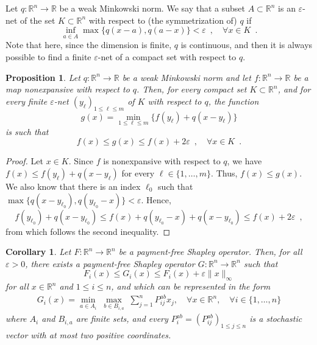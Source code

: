 \documentclass[a4paper,11pt]{amsart}
\newtheorem{proposition}[theorem]{Proposition}
\newtheorem{corollary}[theorem]{Corollary}
\theoremstyle{definition}
\theoremstyle{remark}
\begin{document}
Let $q: {\mathbb{R}}^n \to {\mathbb{R}}$ be a weak Minkowski norm.
We say that a subset $A \subset {\mathbb{R}}^n$ is an $\varepsilon$-net of the set $K \subset {\mathbb{R}}^n$ with respect to (the symmetrization of) $q$ if
\[
  \inf_{a \in A} \max \{ q(x-a),q(a-x) \} < \varepsilon \enspace , \quad \forall x \in K \enspace .
\]
Note that here, since the dimension is finite, $q$ is continuous, and then it is always possible to find a finite $\varepsilon$-net of a compact set with respect to $q$.
\begin{proposition}
  Let $q: {\mathbb{R}}^n \to {\mathbb{R}}$ be a weak Minkowski norm and let $f: {\mathbb{R}}^n \to {\mathbb{R}}$ be a map nonexpansive with respect to $q$.
  Then, for every compact set $K \subset {\mathbb{R}}^n$, and for every finite $\varepsilon$-net $(y_\ell)_{1 {\leqslant} \ell {\leqslant} m}$ of $K$ with respect to $q$, the function
  \[
    g(x) = \min_{1 {\leqslant} \ell {\leqslant} m} \{ f(y_\ell) + q(x-y_\ell) \}
  \]
  is such that
  \[
    f(x) {\leqslant} g(x) {\leqslant} f(x) + 2 \varepsilon \enspace, \quad \forall x \in K \enspace .
  \]
\end{proposition}

\begin{proof}
  Let $x \in K$.
  Since $f$ is nonexpansive with respect to $q$, we have $f(x) {\leqslant} f(y_\ell) + q(x-y_\ell)$ for every $\ell \in \{1,\dots,m\}$.
  Thus, $f(x) {\leqslant} g(x)$.
  We also know that there is an index $\ell_0$ such that $\max \{ q(x-y_{\ell_0}),q(y_{\ell_0}-x) \} < \varepsilon$.
  Hence,
  \[
    f(y_{\ell_0}) + q(x-y_{\ell_0}) {\leqslant} f(x) + q(y_{\ell_0}-x) + q(x-y_{\ell_0}) {\leqslant} f(x) + 2 \varepsilon \enspace ,
  \]
  from which follows the second inequality.
\end{proof}

\begin{corollary}
  Let $F: {\mathbb{R}}^n \to {\mathbb{R}}^n$ be a payment-free Shapley operator.
  Then, for all $\varepsilon > 0$, there exists a payment-free Shapley operator $G: {\mathbb{R}}^n \to {\mathbb{R}}^n$ such that
  \[
    F_i(x) {\leqslant} G_i(x) {\leqslant} F_i(x) +\varepsilon \|x\|_\infty
  \]
  for all $x \in {\mathbb{R}}^n$ and $1 {\leqslant} i {\leqslant} n$, and which can be represented in the form
  \begin{align}
    \label{eq:PaymentFreeOperatorApprox}
    G_i(x) = \min_{a \in A_i} \; \max_{b \in B_{i,a}} \; \sum_{j=1}^n P_{i j}^{a b} x_j, \quad \forall x \in {\mathbb{R}}^n, \quad \forall i \in \{1,\dots,n\}
  \end{align}
  where $A_i$ and $B_{i,a}$ are {\em finite} sets, and every $P_i^{a b} = (P_{i j}^{a b})_{1 {\leqslant} j {\leqslant} n}$ is a stochastic vector with at most two positive coordinates.
\end{corollary}
\end{document}
